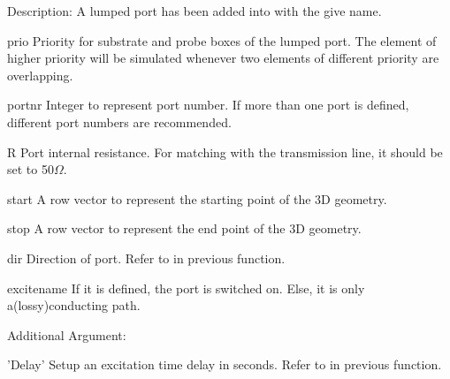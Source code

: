 \begin{FontDescr}{Description:}
 A lumped port has been added into \hyperref[CSX]{} with the give name. 
 
\begin{FontPara}{prio}
Priority for substrate and probe boxes of the lumped port. The element of higher priority will be simulated whenever two elements of different priority are overlapping.  
\end{FontPara}

\begin{FontPara}{portnr}
Integer to represent port number. If more than one port is defined, different port numbers are recommended. 
\end{FontPara}

\begin{FontPara}{R}
Port internal resistance. For matching with the transmission line, it should be set to 50$\Omega$. 
\end{FontPara}

\begin{FontPara}{start}
A row vector to represent the starting point of the 3D geometry.
\end{FontPara}

\begin{FontPara}{stop}
A row vector to represent the end point of the 3D geometry.
\end{FontPara}

\begin{FontPara}{dir}
Direction of port. Refer to \hyperref[excite_dir]{} in previous function.
\end{FontPara}

\begin{FontPara}{excitename}
If it is defined, the port is switched on. Else, it is only a(lossy)conducting path.
\end{FontPara}

\end{FontDescr} 

\begin{FontDescr}{Additional Argument:}
\begin{FontPara}{'Delay'}
Setup an excitation time delay in seconds. Refer to \hyperref[delay]{} in previous function.
\end{FontPara}
\end{FontDescr} 

